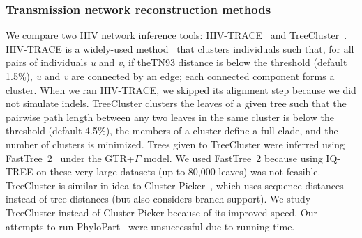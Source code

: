 \subsubsection{Transmission network reconstruction methods} We compare two \gls{HIV} network inference tools: HIV-TRACE~\cite{Pond2018} and TreeCluster~\cite{Balaban2019}. HIV-TRACE is a widely-used method~\cite{Rose2017,Wertheim2017,Perez-Losada2017} that clusters individuals such that, for all pairs of individuals \textit{u} and \textit{v}, if the\gls{TN93} distance is below the threshold (default 1.5\%), \textit{u} and \textit{v} are connected by an edge; each connected component  forms a cluster. When we ran HIV-TRACE, we skipped its alignment step because we did not simulate indels. TreeCluster clusters the leaves of a given tree such that the pairwise path length between any two leaves in the same cluster is below the threshold (default 4.5\%), the members of a cluster define a full clade, and the number of clusters is minimized. Trees given to TreeCluster were inferred using FastTree~2~\cite{Price2010} under the \gls{GTR}+$\Gamma$ model. We used FastTree~2 because using IQ-TREE on these very large datasets (up to 80,000 leaves) was not feasible. TreeCluster is similar in idea to Cluster Picker~\cite{Ragonnet-Cronin2013}, which uses sequence distances instead of tree distances (but also considers branch support). We study TreeCluster instead of Cluster Picker because of its improved speed.  Our attempts to run PhyloPart~\cite{Prosperi2011} were unsuccessful due to running time.

